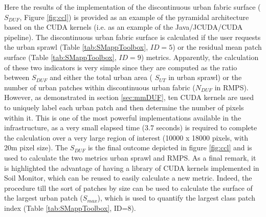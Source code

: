 \documentclass[APA,LATO1COL,doublespace]{WileyNJD-v2}
\newcommand{\toberevised}[1]{\emph{\textcolor{red}{#1}}} %
\begin{document}
Here the results of the implementation of the discontinuous urban fabric surface ($S_{DUF}$, Figure \ref{fig:ccl}) is provided as an example of the pyramidal architecture based on the CUDA kernels (i.e. as an example of the Java/JCUDA/CUDA pipeline).
The discontinuous urban fabric surface is calculated if the user requests the urban sprawl (Table \ref{tab:SMappToolbox}, $ID = 5$) or the residual mean patch surface (Table \ref{tab:SMappToolbox}, $ID = 9$) metrics.
Apparently, the calculation of these two indicators is very simple since they are computed as the ratio between 
$S_{DUF}$ and either the total urban area ( $S_{UT}$ in urban sprawl) or the number of urban patches within discontinuous urban fabric ($N_{DUF}$ in RMPS).
However, as demonstrated in section \ref{sec:mmDUF}, ten CUDA kernels are used to uniquely label each urban patch and then determine the number of pixels within it.
This is one of the most powerful implementations available in the infrastructure, as a very small elapsed time (3.7 seconds) is required to complete the calculation over a very large region of interest (10000 x 18000 pixels, with 20m pixel size).
The $S_{DUF}$ is the final outcome depicted in figure \ref{fig:ccl} and is used to calculate the two metrics urban sprawl and RMPS.
As a final remark, it is highlighted the advantage of having a library of CUDA kernels implemented in Soil Monitor, which can be reused to easily calculate a new metric.
Indeed, the procedure till the sort of patches by size can be used to calculate the surface of the largest urban patch ($S_{max}$), which is used to quantify the largest class patch index (Table \ref{tab:SMappToolbox}, ID=8).

\end{document}
